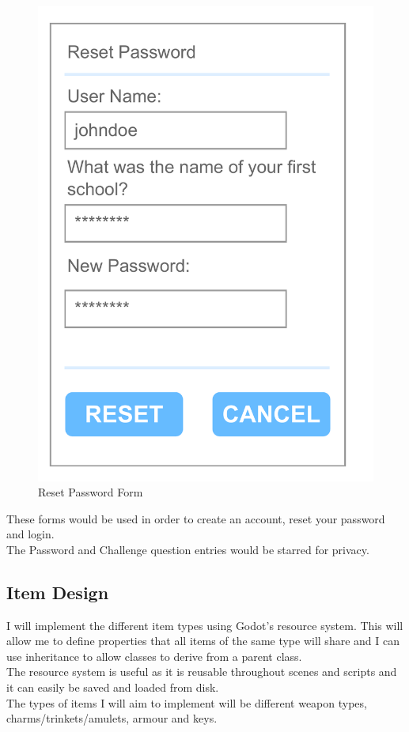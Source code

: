 \documentclass{article}
\begin{document}
\begin{multicols}{3}
\begin{figure}[H]
                        \includegraphics[width = 0.9\columnwidth]{images/design/Reset_Password.pdf}
                        \caption{Reset Password Form}
                        \label{fig:ie_5}
                \end{figure}
        \end{multicols}\[\]
        These forms would be used in order to create an account, reset your password and login.\\
        The Password and Challenge question entries would be starred for privacy.\\
        \newpage
        \subsection{Item Design}
        I will implement the different item types using Godot's resource system. This will allow me to define properties that all items of the same type will share and I can use inheritance to allow classes to derive from a parent class.\\
        The resource system is useful as it is reusable throughout scenes and scripts and it can easily be saved and loaded from disk.\\
        The types of items I will aim to implement will be different weapon types, charms/trinkets/amulets, armour and keys.\\
\end{document}
